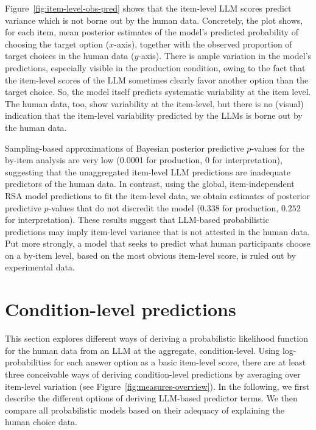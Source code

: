 \documentclass[fleqn]{article}
\begin{document}
Figure~\ref{fig:item-level-obs-pred} shows that the item-level LLM scores predict variance which is not borne out by the human data.
Concretely, the plot shows, for each item, mean posterior estimates of the model's predicted probability of choosing the target option ($x$-axis), together with the observed proportion of target choices in the human data ($y$-axis).
There is ample variation in the model's predictions, especially visible in the production condition, owing to the fact that the item-level scores of the LLM sometimes clearly favor another option than the target choice.
So, the model itself predicts systematic variability at the item level.
The human data, too, show variability at the item-level, but there is no (visual) indication that the item-level variability predicted by the LLMs is borne out by the human data.

Sampling-based approximations of Bayesian posterior predictive $p$-values for the by-item analysis are very low (0.0001 for production, 0 for interpretation), suggesting that the unaggregated item-level LLM predictions are inadequate predictors of the human data.
In contrast, using the global, item-independent RSA model predictions to fit the item-level data, we obtain estimates of posterior predictive $p$-values that do not discredit the model ($0.338$ for production, $0.252$ for interpretation).
These results suggest that LLM-based probabilistic predictions may imply item-level variance that is not attested in the human data.
Put more strongly, a model that seeks to predict what human participants choose on a by-item level, based on the most obvious item-level score, is ruled out by experimental data.



\section{Condition-level predictions}
\label{llm-predictions-for-reference-games}

This section explores different ways of deriving a probabilistic likelihood function for the human data from an LLM at the aggregate, condition-level.
Using log-probabilities for each answer option as a basic item-level score, there are at least three conceivable ways of deriving condition-level predictions by averaging over item-level variation (see Figure~\ref{fig:measures-overview}).
In the following, we first describe the different options of deriving LLM-based predictor terms.
We then compare all probabilistic models based on their adequacy of explaining the human choice data.
\end{document}
